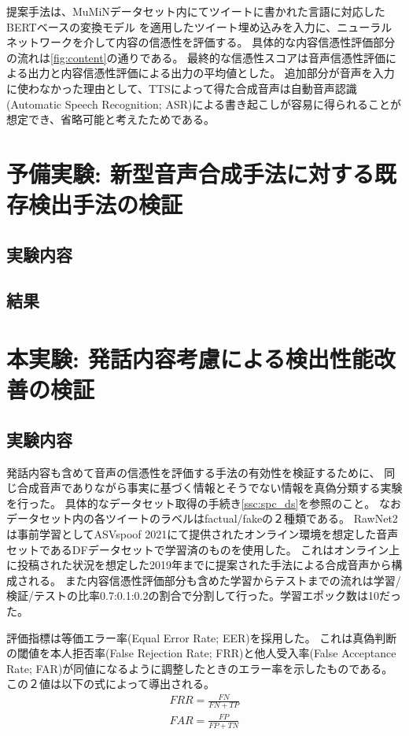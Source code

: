 提案手法は、MuMiNデータセット内にてツイートに書かれた言語に対応したBERTベースの変換モデル \cite{lewis-etal-2020-bart}を適用したツイート埋め込みを入力に、ニューラルネットワークを介して内容の信憑性を評価する。
具体的な内容信憑性評価部分の流れは\cref{fig:content}の通りである。
最終的な信憑性スコアは音声信憑性評価による出力と内容信憑性評価による出力の平均値とした。
追加部分が音声を入力に使わなかった理由として、TTSによって得た合成音声は自動音声認識(Automatic Speech Recognition; ASR)による書き起こしが容易に得られることが想定でき、省略可能と考えたためである。

\section{予備実験: 新型音声合成手法に対する既存検出手法の検証}
\subsection{実験内容}
\subsection{結果}
\section{本実験: 発話内容考慮による検出性能改善の検証}\label{sec:cnt_main}
\subsection{実験内容}
発話内容も含めて音声の信憑性を評価する手法の有効性を検証するために、
同じ合成音声でありながら事実に基づく情報とそうでない情報を真偽分類する実験を行った。
具体的なデータセット取得の手続き\cref{ssc:spc_ds}を参照のこと。
なおデータセット内の各ツイートのラベルはfactual/fakeの２種類である。
RawNet2は事前学習としてASVspoof 2021にて提供されたオンライン環境を想定した音声セットであるDFデータセットで学習済のものを使用した。
これはオンライン上に投稿された状況を想定した2019年までに提案された手法による合成音声から構成される。
また内容信憑性評価部分も含めた学習からテストまでの流れは学習/検証/テストの比率0.7:0.1:0.2の割合で分割して行った。学習エポック数は10だった。

評価指標は等価エラー率(Equal Error Rate; EER)を採用した。
これは真偽判断の閾値を本人拒否率(False Rejection Rate; FRR)と他人受入率(False Acceptance Rate; FAR)が同値になるように調整したときのエラー率を示したものである。
この２値は以下の式によって導出される。
\begin{eqnarray}
    FRR = \frac{FN}{FN+TP} \\
    FAR = \frac{FP}{FP+TN}
\end{eqnarray}

